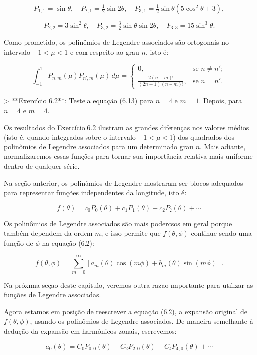 $$
P_{1,1} = \sin\theta, \quad
P_{2,1} = \tfrac{1}{2} \sin 2\theta, \quad
P_{3,1} = \tfrac{1}{2} \sin\theta (5\cos^2\theta + 3),
$$

$$
P_{2,2} = 3\sin^2\theta, \quad
P_{3,2} = \tfrac{3}{2} \sin\theta \sin 2\theta, \quad
P_{3,3} = 15 \sin^3\theta. \tag{6.12}
$$

Como prometido, os polinômios de Legendre associados são ortogonais no intervalo $-1 < \mu < 1$ e com respeito ao grau $n$, isto é:

$$
\int_{-1}^{1} P_{n,m}(\mu) P_{n',m}(\mu) \, d\mu =
\begin{cases}
0, & \text{se } n \ne n'; \\
\frac{2(n+m)!}{(2n+1)(n-m)!}, & \text{se } n = n'. \tag{6.13}
\end{cases}
$$

> **Exercício 6.2**: Teste a equação (6.13) para $n = 4$ e $m = 1$. Depois, para $n = 4$ e $m = 4$.

Os resultados do Exercício 6.2 ilustram as grandes diferenças nos valores médios (isto é, quando integrados sobre o intervalo $-1 < \mu < 1$) dos quadrados dos polinômios de Legendre associados para um determinado grau $n$. Mais adiante, normalizaremos essas funções para tornar sua importância relativa mais uniforme dentro de qualquer série.

Na seção anterior, os polinômios de Legendre mostraram ser blocos adequados para representar funções independentes da longitude, isto é:

$$
f(\theta) = c_0 P_0(\theta) + c_1 P_1(\theta) + c_2 P_2(\theta) + \cdots
$$

Os polinômios de Legendre associados são mais poderosos em geral porque também dependem da ordem $m$, e isso permite que $f(\theta, \phi)$ continue sendo uma função de $\phi$ na equação (6.2):

$$
f(\theta, \phi) = \sum_{m=0}^{\infty} \left[ a_m(\theta) \cos(m\phi) + b_m(\theta) \sin(m\phi) \right].
$$

Na próxima seção deste capítulo, veremos outra razão importante para utilizar as funções de Legendre associadas.

Agora estamos em posição de reescrever a equação (6.2), a expansão original de $f(\theta, \phi)$, usando os polinômios de Legendre associados. De maneira semelhante à dedução da expansão em harmônicos zonais, escrevemos:

$$
a_0(\theta) = C_0 P_{0,0}(\theta) + C_2 P_{2,0}(\theta) + C_4 P_{4,0}(\theta) + \cdots
$$

